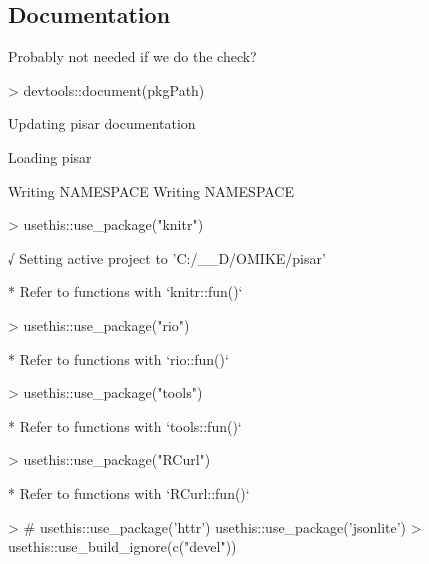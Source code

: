 \documentclass[a4paper,12pt]{article}\usepackage[]{graphicx}\usepackage[]{color}
\begin{document}
\subsection{Documentation}
Probably not needed if we do the check?
\begin{Schunk}
\begin{Sinput}
> devtools::document(pkgPath)
\end{Sinput}
\begin{Soutput}
Updating pisar documentation
\end{Soutput}
\begin{Soutput}
Loading pisar
\end{Soutput}
\begin{Soutput}
Writing NAMESPACE
Writing NAMESPACE
\end{Soutput}
\begin{Sinput}
> usethis::use_package("knitr")
\end{Sinput}
\begin{Soutput}
√ Setting active project to 'C:/__D/OMIKE/pisar'
\end{Soutput}
\begin{Soutput}
Warning in if (delta < 0) {: the condition has length > 1 and only the first element will be used
\end{Soutput}
\begin{Soutput}
Warning in if (delta > 0) {: the condition has length > 1 and only the first element will be used
\end{Soutput}
\begin{Soutput}
* Refer to functions with `knitr::fun()`
\end{Soutput}
\begin{Sinput}
> usethis::use_package("rio")
\end{Sinput}
\begin{Soutput}
* Refer to functions with `rio::fun()`
\end{Soutput}
\begin{Sinput}
> usethis::use_package("tools")
\end{Sinput}
\begin{Soutput}
* Refer to functions with `tools::fun()`
\end{Soutput}
\begin{Sinput}
> usethis::use_package("RCurl")
\end{Sinput}
\begin{Soutput}
* Refer to functions with `RCurl::fun()`
\end{Soutput}
\begin{Sinput}
> # usethis::use_package('httr') usethis::use_package('jsonlite')
> usethis::use_build_ignore(c("devel"))
\end{Sinput}
\end{Schunk}
\clearpage
\end{document}
